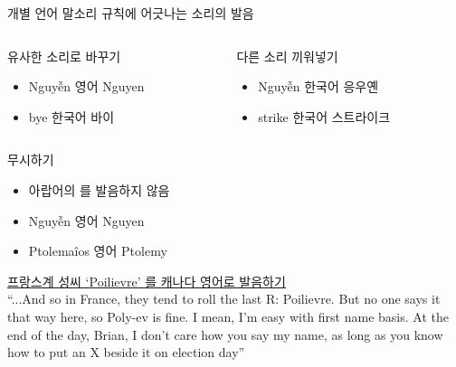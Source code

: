 \documentclass[11pt, aspectratio=169]{beamer}
\newcommand{\texttnr}[1]{{\tnrfont #1}}
\newcommand{\textds}[1]{{\ipafont #1}}
\begin{document}
\begin{frame}[t]{개별 언어 말소리 규칙에 어긋나는 소리의 발음}
    \begin{columns}
        \begin{column}{0.46\textwidth}
            \begin{block}{유사한 소리로 바꾸기}
                \begin{itemize}
                    \item \texttnr{Nguyễn} \rightarrow 영어 Nguyen \textds{[nuˈjɛn]}
                    \item bye \rightarrow 한국어 바이 \textds{[pai]}
                \end{itemize}
            \end{block}            
        \end{column}
        \begin{column}{0.47\textwidth}
            \begin{block}{다른 소리 끼워넣기}
                \begin{itemize}
                    \item \texttnr{Nguyễn} \rightarrow 한국어 응우옌 \textds{[ɯŋujen]}
                    \item strike \rightarrow 한국어 스트라이크
                \end{itemize}
            \end{block}            
        \end{column}
    \end{columns}
    \begin{block}{무시하기}
        \begin{itemize}
            \item 아랍어의 \textds{[ʔ]}를 발음하지 않음
            \item \texttnr{Nguyễn} \rightarrow 영어 Nguyen \textds{[wɪn]}
            \item Ptolemaîos \rightarrow 영어 Ptolemy \textds{[ˈtɒləmi]}
        \end{itemize}
    \end{block}
     \href{https://youtu.be/d_JBDM6IC20?t=37}{\underline{프랑스계 성씨 ‘Poilievre’ \textds{[pwa.ljɛvʁ]}를 캐나다 영어로 발음하기}}\\
    {\scriptsize “...And so in France, they tend to roll the last R: Poilievre. But no one says it that way here, so Poly-ev is fine. I mean, I’m easy with first name basis. At the end of the day, Brian, I don’t care how you say my name, as long as you know how to put an X beside it on election day”}
\end{frame}
\end{document}
